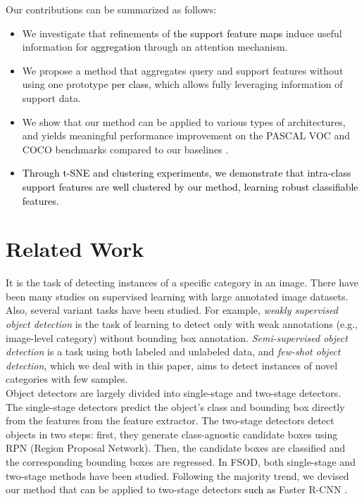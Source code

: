 \documentclass[10pt,twocolumn,letterpaper]{article}
\newcommand{\nj}[1]{\textcolor{black}{#1}}
\newcommand{\hj}[1]{\textcolor{black}{#1}}
\begin{document}
Our contributions can be summarized as follows: \vspace{-0.01cm}
\begin{itemize}[leftmargin=+.15in] 
\vspace{-0.05cm}
    \setlength\itemsep{-0.3em} 
    \item We investigate that refinements of \hj{the support feature maps}
induce useful information for \hj{aggregation} 
through an attention mechanism.
    \item We propose a method that aggregates query and support features without using one prototype \hj{per class}, which allows fully leveraging information of support data.
    \item We show that our method can be applied to various types of architectures, and yields meaningful performance improvement on the  PASCAL VOC and COCO benchmarks compared to our baselines \cite{fan2020fsod, xiao2020few}. 
    \item \hj{Through t-SNE and clustering experiments, we demonstrate that intra-class support features are well clustered by our method, learning robust classifiable features.}
\end{itemize}

\section{Related Work} \vspace{-0.1cm}
\label{sec:related}
\quad It is the task of detecting instances of a specific category in an image. There have been many studies \cite{ren2015faster, redmon2017yolo9000, liu2016ssd} on supervised learning with large annotated image datasets. Also, several variant tasks have been studied. For example, \textit{weakly supervised object detection} \cite{kim2020tell, durand2017wildcat} is the task of learning to detect only with weak annotations (e.g., image-level category) without bounding box annotation. \textit{Semi-supervised object detection} \cite{jeong2019consistency, sohn2020simple} is a task using both labeled and unlabeled data, and \textit{few-shot object detection}, which we deal with in this paper, aims to detect instances of novel categories with few samples. \\
\indent Object detectors are largely divided into single-stage and two-stage detectors. The single-stage detectors \cite{liu2016ssd, lin2017focal} predict the object's class and bounding box directly from the features from the feature extractor. 
The two-stage detectors \cite{ren2015faster, cai2018cascade} detect objects in two steps: first, they generate class-agnostic candidate boxes using RPN (Region Proposal Network). Then, the candidate boxes are classified and the corresponding bounding boxes are regressed. In FSOD, both single-stage \cite{chen2018lstd, kang2019few} and two-stage methods \cite{yan2019meta, wang2020frustratingly, fan2020fsod, xiao2020few} have been studied. Following the majority trend, we devised our method that can be applied to two-stage detectors \nj{such as} Faster R-CNN \cite{ren2015faster}. 
\end{document}
